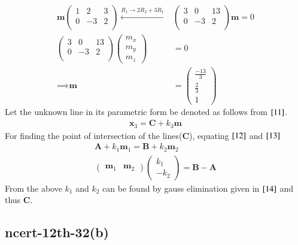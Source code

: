 \documentclass[journal,12pt,onecolumn]{IEEEtran}
\theoremstyle{remark}
\begin{document}
\begin{align}
    \textbf{m}\begin{pmatrix}
        1 & 2 & 3\\
        0 & -3 & 2   \\
    \end{pmatrix} \xleftarrow{R_1 \to 2R_2 + 3R_1} &\begin{pmatrix}
        3 & 0 & 13\\
        0 & -3 & 2   \\
    \end{pmatrix}\textbf{m} = 0\\
    \begin{pmatrix}
        3 & 0 & 13\\
        0 & -3 & 2   \\
    \end{pmatrix}\begin{pmatrix}
        m_x\\
        m_y\\
        m_z
    \end{pmatrix} &= 0\\
    \implies \textbf{m} &= \begin{pmatrix}
        \frac{-13}{3}\\
        \frac{2}{3}\\
        1
    \end{pmatrix}
\end{align}
Let the unknown line in its parametric form be denoted as follows from $\eqref{11}$.
\begin{align}
    \textbf{x}_3 = \textbf{C} + k_3\textbf{m}
\end{align}
For finding the point of intersection of the lines($\textbf{C}$), equating $\eqref{12}$ and $\eqref{13}$
\begin{align}
    \textbf{A} + k_1\textbf{m}_1 = \textbf{B} + k_2\textbf{m}_2\\
    \begin{pmatrix}
        \textbf{m}_1 & \textbf{m}_2
    \end{pmatrix}\begin{pmatrix}
        k_1 \\
        -k_2
    \end{pmatrix} = \textbf{B}-\textbf{A}
\end{align}
From the above $k_1$ and $k_2$ can be found by gauss elimination given in $\eqref{14}$ and thus $\textbf{C}$.

\subsection{ncert-12th-32(b)}
\end{document}

